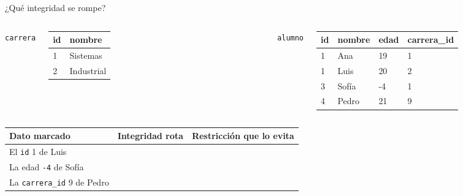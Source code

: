 \documentclass[aspectratio=169,10pt,c]{beamer}
\newcommand{\bl}[1][1.9cm]{\underline{\hspace{#1}}}
\newcommand{\tbl}[1]{\textcolor{utpNaranja}{\texttt{#1}}}
\newcommand{\ins}[1]{\tikz[baseline=-0.5ex]{\node[rounded corners=2pt,fill=utpRojo,text=white,
  font=\bfseries\scriptsize,inner xsep=5pt,inner ysep=2.5pt] {#1};}}
\newcommand{\mal}[1]{{\setlength{\fboxsep}{1.2pt}\colorbox{utpRojo!18}{#1}}}
\begin{document}
\begin{frame}{\ins{Práctica 1} ¿Qué integridad se rompe?}
\begin{columns}[c,onlytextwidth]
\centering
\tbl{carrera}\\[4pt]
\scriptsize\ttfamily
\begin{tabular}{ll}
\toprule
\normalfont\bfseries id & \normalfont\bfseries nombre \\
\midrule
1 & Sistemas \\
2 & Industrial \\
\bottomrule
\end{tabular}
\centering
\tbl{alumno}\\[4pt]
\scriptsize\ttfamily
\begin{tabular}{llll}
\toprule
\normalfont\bfseries id & \normalfont\bfseries nombre & \normalfont\bfseries edad & \normalfont\bfseries carrera\_id \\
\midrule
1 & Ana & 19 & 1 \\
\mal{1} & Luis & 20 & 2 \\
3 & Sofía & \mal{-4} & 1 \\
4 & Pedro & 21 & \mal{9} \\
\bottomrule
\end{tabular}
\end{columns}
\vspace{0.55cm}
\begin{center}
\small
\begin{tabular}{>{\raggedright\arraybackslash}p{5.2cm}>{\raggedright\arraybackslash}p{3.2cm}>{\raggedright\arraybackslash}p{3.4cm}}
\toprule
\bfseries Dato marcado & \bfseries Integridad rota & \bfseries Restricción que lo evita \\
\midrule
El \texttt{id} 1 de Luis & \bl[2.6cm] & \bl[2.8cm] \\[6pt]
La edad \texttt{-4} de Sofía & \bl[2.6cm] & \bl[2.8cm] \\[6pt]
La \texttt{carrera\_id} 9 de Pedro & \bl[2.6cm] & \bl[2.8cm] \\
\bottomrule
\end{tabular}
\end{center}
\end{frame}
\end{document}

